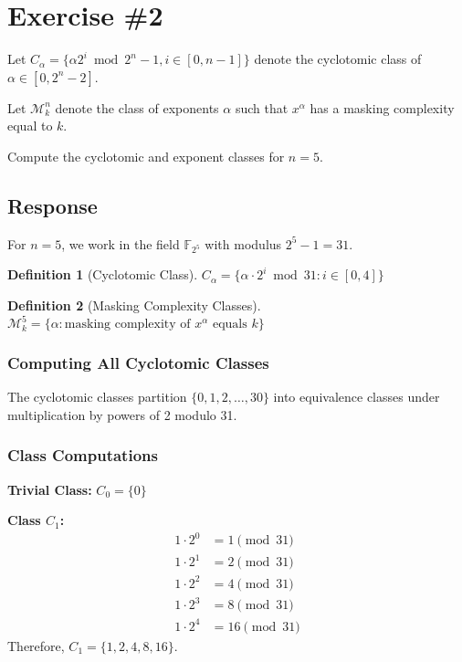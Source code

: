 \documentclass{article}
\newtheorem{definition}{Definition}
\begin{document}
\section*{Exercise \#2}

Let $C_\alpha = \{ \alpha2^i \bmod{2^n-1}, i\in[0,n-1]\}$ denote the cyclotomic class of $\alpha\in[0,2^n-2]$.

Let $\mathcal{M}_k^n$ denote the class of exponents $\alpha$ such that $x^\alpha$ has a masking complexity equal to $k$.

Compute the cyclotomic and exponent classes for $n=5$.

\subsection*{Response}

For $n=5$, we work in the field $\mathbb{F}_{2^5}$ with modulus $2^5-1 = 31$.
\begin{definition}[Cyclotomic Class]
$C_\alpha = \{ \alpha \cdot 2^i \bmod{31} : i \in [0,4]\}$
\end{definition}

\begin{definition}[Masking Complexity Classes]
$\mathcal{M}_k^5 = \{\alpha : \text{masking complexity of } x^\alpha \text{ equals } k\}$
\end{definition}

\subsubsection*{Computing All Cyclotomic Classes}

The cyclotomic classes partition $\{0, 1, 2, \ldots, 30\}$ into equivalence classes under multiplication by powers of 2 modulo 31.

\subsubsection*{Class Computations}

\textbf{Trivial Class:} $C_0 = \{0\}$

\textbf{Class $C_1$:}
\begin{align*}
1 \cdot 2^0 &= 1 \pmod{31} \\
1 \cdot 2^1 &= 2 \pmod{31} \\
1 \cdot 2^2 &= 4 \pmod{31} \\
1 \cdot 2^3 &= 8 \pmod{31} \\
1 \cdot 2^4 &= 16 \pmod{31}
\end{align*}
Therefore, $C_1 = \{1, 2, 4, 8, 16\}$.
\end{document}
